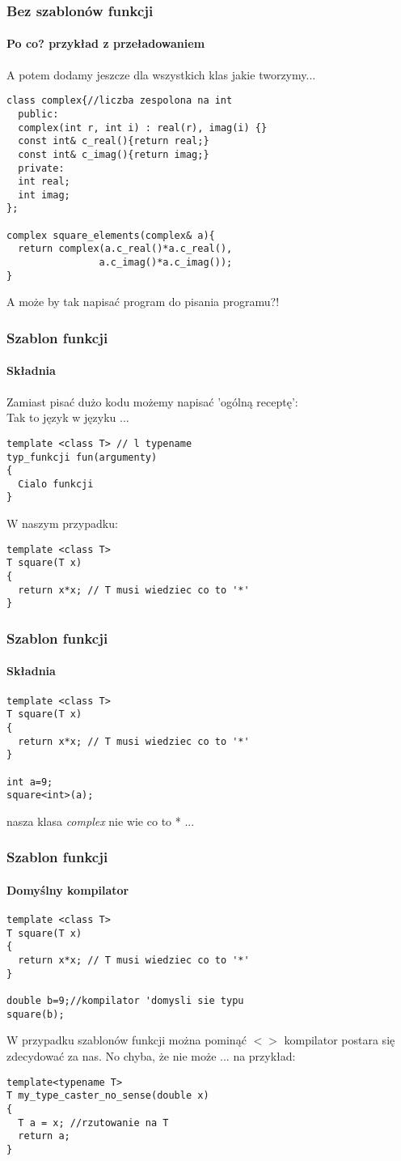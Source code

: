\documentclass[10pt]{beamer}
\begin{document}
\begin{frame}[fragile]
  \frametitle{Bez szablonów funkcji}
  \framesubtitle{Po co? przykład z przeładowaniem}

A potem dodamy jeszcze dla wszystkich klas jakie tworzymy...
\vspace{0.1cm}
\begin{lstlisting}
class complex{//liczba zespolona na int
  public:
  complex(int r, int i) : real(r), imag(i) {}
  const int& c_real(){return real;}
  const int& c_imag(){return imag;}
  private:
  int real;
  int imag;
};

complex square_elements(complex& a){
  return complex(a.c_real()*a.c_real(),
                a.c_imag()*a.c_imag());
}
\end{lstlisting}
A może by tak napisać program do pisania programu?!
\end{frame}

\begin{frame}[fragile]
  \frametitle{Szablon funkcji}
  \framesubtitle{Składnia}
Zamiast pisać dużo kodu możemy napisać 'ogólną receptę':\\
Tak to język w języku ...
\vspace{0.1cm}
\begin{lstlisting}
template <class T> // l typename
typ_funkcji fun(argumenty)
{
  Cialo funkcji
}
\end{lstlisting}  
W naszym przypadku:\\
\begin{lstlisting}
template <class T> 
T square(T x)
{
  return x*x; // T musi wiedziec co to '*'
}
\end{lstlisting}  
\end{frame}

\begin{frame}[fragile]
  \frametitle{Szablon funkcji}
  \framesubtitle{Składnia}
\begin{lstlisting}
template <class T> 
T square(T x)
{
  return x*x; // T musi wiedziec co to '*'
}

int a=9;
square<int>(a);
\end{lstlisting}  
nasza klasa \textit{complex} nie wie co to * ...

\end{frame}

\begin{frame}[fragile]
  \frametitle{Szablon funkcji}
  \framesubtitle{Domyślny kompilator}
\begin{lstlisting}
template <class T> 
T square(T x)
{
  return x*x; // T musi wiedziec co to '*'
}

double b=9;//kompilator 'domysli sie typu
square(b);
\end{lstlisting}  

W przypadku szablonów funkcji można pominąć $<>$ kompilator postara się zdecydować za nas. No chyba, że nie może ... na przykład:
\vspace{0.1cm}
\begin{lstlisting}
template<typename T>
T my_type_caster_no_sense(double x)
{
  T a = x; //rzutowanie na T
  return a;
}
\end{lstlisting}

\end{frame}
\end{document}
